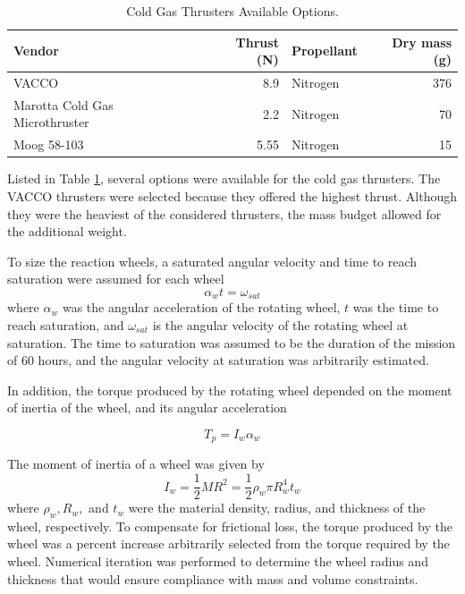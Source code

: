 \documentclass[paper=letter, fontsize=11pt]{scrartcl} %
\numberwithin{equation}{section} %
\numberwithin{figure}{section} %
\numberwithin{table}{section} %
\begin{document}
\begin{table}[htb]
    \centering
    \begin{tabular}{l r l r}
        \toprule
        Vendor                                          & Thrust (N) & Propellant & Dry mass (g) \\
        \midrule
        VACCO~\cite{cold_gas_thruster}                  & 8.9        & Nitrogen   & 376          \\
        Marotta Cold Gas Microthruster~\cite{cold_gas2} & 2.2        & Nitrogen   & 70           \\
        Moog 58-103~\cite{space_props}                  & 5.55       & Nitrogen   & 15           \\
        \bottomrule
    \end{tabular}
    \caption{Cold Gas Thrusters Available Options.}
    \label{table:cgta}
\end{table}

\par Listed in Table \ref{table:cgta}, several options were available for the cold gas thrusters. The VACCO thrusters were selected because they offered the highest thrust. Although they were the heaviest of the considered thrusters, the mass budget allowed for the additional weight.

\par To size the reaction wheels, a saturated angular velocity and time to reach saturation were assumed for each wheel
\begin{equation*}
    \alpha_w t = \omega_{sat}
    \label{equation:alphasat}
\end{equation*}
where $\alpha_w$ was the angular acceleration of the rotating wheel, $t$ was the time to reach saturation, and $\omega_{sat}$ is the angular velocity of the rotating wheel at saturation. The time to saturation was assumed to be the duration of the mission of 60 hours, and the angular velocity at saturation was arbitrarily estimated.

In addition, the torque produced by the rotating wheel depended on the moment of inertia of the wheel, and its angular acceleration

\begin{equation*}
    T_p = I_w \alpha_w
    \label{equation:tp}
\end{equation*}

The moment of inertia of a wheel was given by
\begin{equation*}
    I_w = \frac{1}{2}MR^{2}=\frac{1}{2} \rho_{w} \pi R_{w}^{4} t_{w}
    \label{equation:iw}
\end{equation*}
where $\rho_{w}, R_{w},$ and $t_{w}$ were the material density, radius, and thickness of the wheel, respectively. To compensate for frictional loss, the torque produced by the wheel was a percent increase arbitrarily selected from the torque required by the wheel. Numerical iteration was performed to determine the wheel radius and thickness that would ensure compliance with mass and volume constraints.
\end{document}
